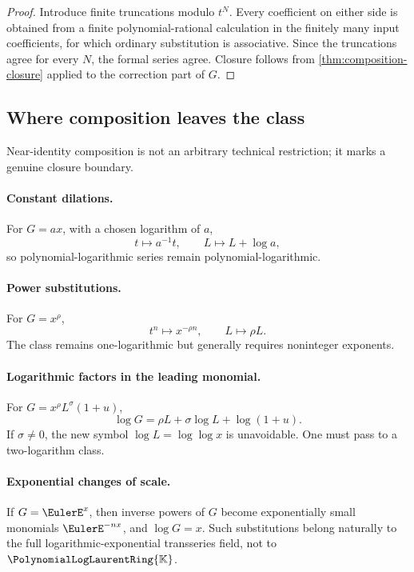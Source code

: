 \documentclass[11pt]{article}
\theoremstyle{pltheorem}
\newcommand{\K}{\mathbb K}
\newcommand{\PLL}{\PolynomialLogLaurentRing{\K}}
\begin{document}
\begin{proof}
Introduce finite truncations modulo \(t^N\).  Every coefficient on either side is obtained from a finite polynomial-rational calculation in the finitely many input coefficients, for which ordinary substitution is associative.  Since the truncations agree for every \(N\), the formal series agree.  Closure follows from \cref{thm:composition-closure} applied to the correction part of \(G\).
\end{proof}

\subsection{Where composition leaves the class}

Near-identity composition is not an arbitrary technical restriction; it marks a genuine closure boundary.

\paragraph{Constant dilations.}
For \(G=ax\), with a chosen logarithm of \(a\),
\[
 t\mapsto a^{-1}t,
 \qquad
 L\mapsto L+\log a,
\]
so polynomial-logarithmic series remain polynomial-logarithmic.

\paragraph{Power substitutions.}
For \(G=x^\rho\),
\[
 t^n\mapsto x^{-\rho n},
 \qquad
 L\mapsto\rho L.
\]
The class remains one-logarithmic but generally requires noninteger exponents.

\paragraph{Logarithmic factors in the leading monomial.}
For
\(G=x^\rho L^\sigma(1+u)\),
\begin{equation}\label{eq:log-leading-log-factor}
 \log G=\rho L+\sigma\log L+\log(1+u).
\end{equation}
If \(\sigma\ne0\), the new symbol \(\log L=\log\log x\) is unavoidable.  One must pass to a two-logarithm class.

\paragraph{Exponential changes of scale.}
If \(G=\EulerE^x\), then inverse powers of \(G\) become exponentially small monomials \(\EulerE^{-nx}\), and \(\log G=x\).  Such substitutions belong naturally to the full logarithmic-exponential transseries field, not to \(\PLL\).
\end{document}
